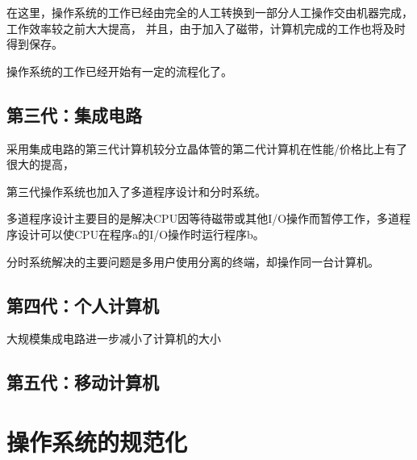 在这里，操作系统的工作已经由完全的人工转换到一部分人工操作交由机器完成，工作效率较之前大大提高，
并且，由于加入了磁带，计算机完成的工作也将及时得到保存。

操作系统的工作已经开始有一定的流程化了。

\subsection{第三代：集成电路}

采用集成电路的第三代计算机较分立晶体管的第二代计算机在性能/价格比上有了很大的提高，

第三代操作系统也加入了多道程序设计和分时系统。

多道程序设计主要目的是解决CPU因等待磁带或其他I/O操作而暂停工作，多道程序设计可以使CPU在程序a的I/O操作时运行程序b。

分时系统解决的主要问题是多用户使用分离的终端，却操作同一台计算机。

\subsection{第四代：个人计算机}

大规模集成电路进一步减小了计算机的大小

\subsection{第五代：移动计算机}

\section{操作系统的规范化}